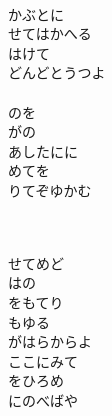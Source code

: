 \documentclass[10pt,b5j]{tarticle} %
\begin{document}
\begin{enumerate}
\begin{minipage}[c]{\blocksize}
    \end{minipage}
    \begin{minipage}[c]{\blocksize}
        
        \vspace{\linespace}
        \item~\\
        かぶとに\\
        せてはかへる\\
        はけて\\
        どんどとうつよ\\
        \\
        のを\\
        がの\\
        あしたにに\\
        めてを\\
        りてぞゆかむ
        
    \end{minipage}
    \begin{minipage}[c]{\blocksize}
        
        \vspace{\linespace}
        \item~\\
        \\
        せてめど\\
        はの\\
        をもてり\\
        もゆる\\
        がはらからよ\\
        ここにみて\\
        をひろめ\\
        にのべばや\\
    
    \end{minipage}
\end{enumerate} %
\end{document}
